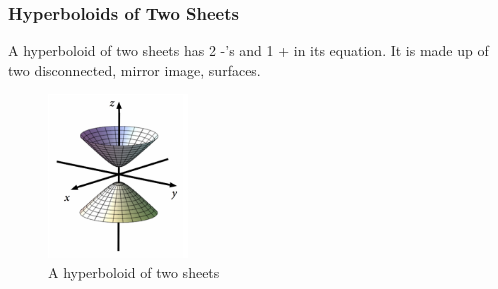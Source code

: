 \subsubsection{Hyperboloids of Two Sheets}
\noindent
A hyperboloid of two sheets has 2 -'s and 1 + in its equation. It is made up of two disconnected, mirror image, surfaces.

\begin{figure}[H]
	\centering
	\includegraphics[width=0.33\textwidth]{./differentialMultivariableCalculus/two_sheets.png}
	\caption{A hyperboloid of two sheets}
\end{figure}